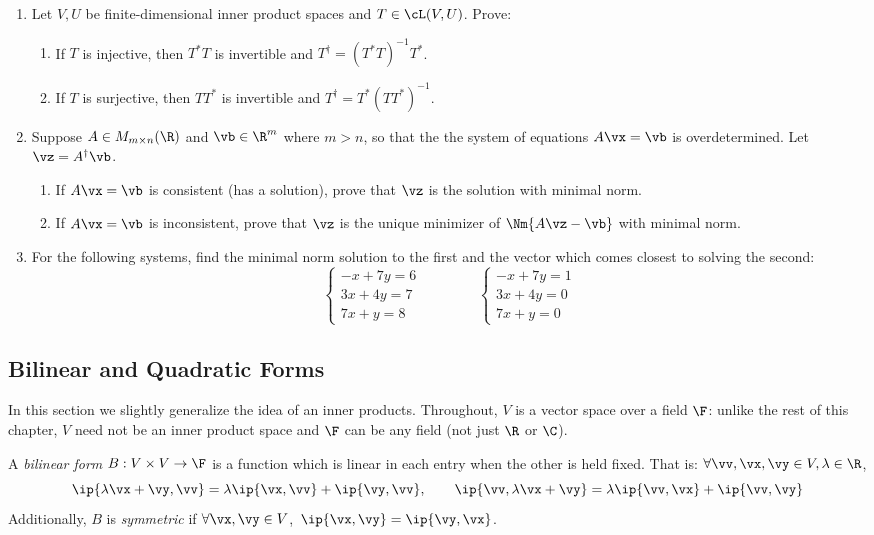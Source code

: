 \begin{exercises}[breakable]
\begin{enumerate}[label=\thesubsection.\arabic*., align=right]
  \item Let $V,U$ be finite-dimensional inner product spaces and $T\in\cL(V,U)$. Prove:
  \begin{enumerate}
    \item If $T$ is injective, then $T^*T$ is invertible and $T^\dag=(T^*T)^{-1}T^*$.
    \item If $T$ is surjective, then $TT^*$ is invertible and $T^\dag=T^*(TT^*)^{-1}$.
	\end{enumerate}

	\item Suppose $A\in M_{m\times n}(\R)$ and $\vb\in\R^m$ where $m>n$, so that the the system of equations $A\vx=\vb$ is overdetermined. Let $\vz=A^\dag\vb$.
	\begin{enumerate}
	  \item If $A\vx=\vb$ is consistent (has a solution), prove that $\vz$ is the solution with minimal norm.
	  \item If $A\vx=\vb$ is inconsistent, prove that $\vz$ is the unique minimizer of $\Nm{A\vz-\vb}$ with minimal norm.
	\end{enumerate}
	
	\item For the following systems, find the minimal norm solution to the first and the vector which comes closest to solving the second:
	\[\begin{cases}
		-x+7y=6\\
		3x+4y=7\\
		7x+y=8
		\end{cases}
		\qquad\qquad
		\begin{cases}
		-x+7y=1\\
		3x+4y=0\\
		7x+y=0
		\end{cases}\]
\end{enumerate}
\end{exercises}


\subsection{Bilinear and Quadratic Forms}

In this section we slightly generalize the idea of an inner products. Throughout, $V$ is a vector space over a field $\F$: unlike the rest of this chapter, $V$ need not be an inner product space and $\F$ can be any field (not just $\R$ or $\C$).

\begin{defn}{}{}
A \emph{bilinear form} $B:V\times V\to\F$ is a function which is linear in each entry when the other is held fixed. That is: $\forall \vv,\vx,\vy\in V,\lambda\in\R$,
  \[\ip{\lambda\vx+\vy,\vv}=\lambda\ip{\vx,\vv}+\ip{\vy,\vv},\qquad \ip{\vv,\lambda\vx+\vy}=\lambda\ip{\vv,\vx}+\ip{\vv,\vy}\]
Additionally, $B$ is \emph{symmetric} if $\forall \vx,\vy\in V$,\ $\ip{\vx,\vy}=\ip{\vy,\vx}$.
\end{defn}

